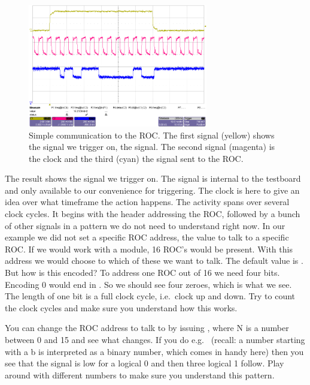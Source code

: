\begin{figure}[h]
    \begin{center}
	\includegraphics[width=0.7\textwidth]{img/tut_scope2.png}
	\caption{Simple communication to the ROC. The first signal (yellow) shows the signal we trigger on, the  signal. The second signal (magenta) is the clock and the third (cyan) the signal sent to the ROC.}
	\label{fig:tut_scope2}
    \end{center}
\end{figure}

The result shows the signal we trigger on. The  signal is internal to the testboard and only available to our convenience for triggering. The clock is here to give an idea over what timeframe the action happens. The activity spans over several clock cycles. It begins with the header addressing the ROC, followed by a bunch of other signals in a pattern we do not need to understand right now. In our example we did not set a specific ROC address, the value to talk to a specific ROC. If we would work with a module, 16 ROC's would be present. With this address we would choose to which of these we want to talk. The default value is . But how is this encoded? To address one ROC out of 16 we need four bits. Encoding 0 would end in . So we should see four zeroes, which is what we see. The length of one bit is a full clock cycle, i.e.~clock up and down. Try to count the clock cycles and make sure you understand how this works.

You can change the ROC address to talk to by issuing , where N is a number between 0 and 15 and see what changes. If you do e.g.~ (recall: a number starting with a b is interpreted as a binary number, which comes in handy here) then you see that the signal is low for a logical 0 and then three logical 1 follow. Play around with different numbers to make sure you understand this pattern.

